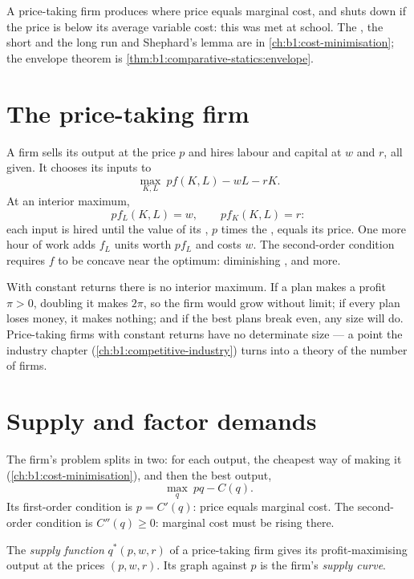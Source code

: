 \begin{recall}
A price-taking firm produces where price equals marginal cost, and shuts
down if the price is below its average variable cost: this was met at
school. The , the short and the long run and Shephard's lemma
are in \cref{ch:b1:cost-minimisation}; the envelope theorem is
\cref{thm:b1:comparative-statics:envelope}.
\end{recall}

\section{The price-taking firm}\label{sec:b1:profit-maximisation:firm}

A firm sells its output at the price $p$ and hires labour and capital at $w$
and $r$, all given. It chooses its inputs to
\[
\max_{K, L}\ pf(K, L) - wL - rK.
\]
At an interior maximum,
\[
pf_L(K, L) = w,\qquad pf_K(K, L) = r:
\]
each input is hired until the value of its , $p$ times
the , equals its price. One more hour of work adds
$f_L$ units worth $pf_L$ and costs $w$. The second-order condition requires
$f$ to be concave near the optimum: diminishing , and
more.

With constant returns there is no interior maximum. If a plan makes a
profit $\pi > 0$, doubling it makes $2\pi$, so the firm would grow without
limit; if every plan loses money, it makes nothing; and if the best plans
break even, any size will do. Price-taking firms with constant returns
have no determinate size --- a point the industry chapter
(\cref{ch:b1:competitive-industry}) turns into a theory of the number of
firms.

\section{Supply and factor demands}\label{sec:b1:profit-maximisation:supply}

The firm's problem splits in two: for each output, the cheapest way of
making it (\cref{ch:b1:cost-minimisation}), and then the best output,
\[
\max_q\ pq - C(q).
\]
Its first-order condition is $p = C'(q)$: price equals marginal cost. The
second-order condition is $C''(q) \ge 0$: marginal cost must be rising
there.

\begin{definition}\label{def:b1:profit-maximisation:supply-function}
The \emph{supply function} $q^*(p, w, r)$ of a price-taking firm gives its
profit-maximising output at the prices $(p, w, r)$. Its graph against $p$
is the firm's \emph{supply curve}.
\end{definition}

